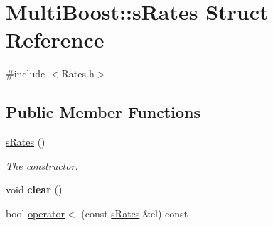 \hypertarget{structMultiBoost_1_1sRates}{\section{Multi\-Boost\-:\-:s\-Rates Struct Reference}
\label{structMultiBoost_1_1sRates}
}


{\ttfamily \#include $<$Rates.\-h$>$}

\subsection*{Public Member Functions}
\begin{DoxyCompactItemize}
\item 
\hypertarget{structMultiBoost_1_1sRates_a13fc5aa3f5350baa32d23c73b8fddfe5}{\hyperlink{structMultiBoost_1_1sRates_a13fc5aa3f5350baa32d23c73b8fddfe5}{s\-Rates} ()}\label{structMultiBoost_1_1sRates_a13fc5aa3f5350baa32d23c73b8fddfe5}

\begin{DoxyCompactList}\small\item\em The constructor. \end{DoxyCompactList}\item 
\hypertarget{structMultiBoost_1_1sRates_a522e82030ecaadaf3400dc56d65a7dcd}{void {\bfseries clear} ()}\label{structMultiBoost_1_1sRates_a522e82030ecaadaf3400dc56d65a7dcd}

\item 
bool \hyperlink{structMultiBoost_1_1sRates_a43d3979b8496e8da092254a23f7d949b}{operator$<$} (const \hyperlink{structMultiBoost_1_1sRates}{s\-Rates} \&el) const 
\end{DoxyCompactItemize}
